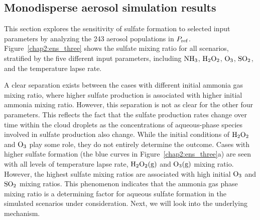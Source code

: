 \documentclass[edeposit,fullpage]{uiucthesis2009}
\begin{document}
\subsection{Monodisperse aerosol simulation results}
This section explores the sensitivity of sulfate formation to selected
input parameters by analyzing the 243 aerosol populations in $P_{\rm
  ref}$.  Figure~\ref{chap2:ens_three} shows the sulfate mixing ratio
for all scenarios, stratified by the five different input parameters,
including $\rm NH_3$, $\rm H_2O_2$, $\rm O_3$, $\rm SO_2$, and the
temperature lapse rate.

A clear separation exists between the cases with different initial
ammonia gas mixing ratio, where higher sulfate production is
associated with higher initial ammonia mixing ratio. However, this
separation is not as clear for the other four parameters. This
reflects the fact that the sulfate production rates change over time
within the cloud droplets as the concentrations of aqueous-phase
species involved in sulfate production also change. While the initial
conditions of $\rm H_2O_2$ and $\rm O_3$ play some role, they do not
entirely determine the outcome. Cases with higher sulfate formation
(the blue curves in Figure~\ref{chap2:ens_three}a) are seen with all
levels of temperature lapse rate, $\rm H_2O_2(g)$ and $\rm O_3(g)$
mixing ratio. However, the highest sulfate mixing ratios are
associated with high initial $\rm O_3$ and $\rm SO_2$ mixing
ratios. This phenomenon indicates that the ammonia gas phase mixing
ratio is a determining factor for aqueous sulfate formation in the
simulated scenarios under consideration. Next, we will look into the
underlying mechanism.
\end{document}
